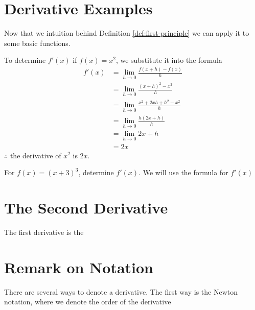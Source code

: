 \documentclass[working]{tuftebook}
\begin{document}
\section{Derivative Examples}
Now that we intuition behind Definition \ref{def:first-principle} we can apply it to some basic functions.
\begin{eg}
    To determine $f'(x)$ if $f(x)=x^2$, we substitute it into the formula 
    \begin{align*}
        f'(x)&= \lim_{h\to 0} \frac{f(x+h)-f(x)}{h}\\ 
        &= \lim_{h\to 0} \frac{(x+h)^2-x^2}{h}\\ 
        &= \lim_{h\to 0} \frac{x^2+2xh+h^2-x^2}{h}\\ 
        &= \lim_{h\to 0} \frac{h(2x+h)}{h}\\ 
        &= \lim_{h\to 0} 2x+h\\ 
        &= 2x
    \end{align*}
    $\therefore$ the derivative of $x^2$ is $2x$.
\end{eg}

\begin{eg}
    For $f(x)=(x+3)^3$, determine $f'(x)$. We will use the formula for $f'(x)$ 
\end{eg}

\section{The Second Derivative}
The first derivative is the 

\section{Remark on Notation}
There are several ways to denote a derivative. The first way is the Newton notation, where we denote the order of the derivative 
\end{document}
